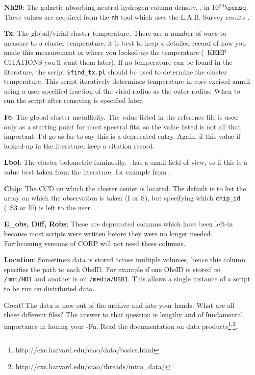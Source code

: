 {\bf{Nh20}}: The galactic absorbing neutral hydrogen column density,
\nhi, in $10^{20} \pcmsq$. These values are acquired from the
{\tt{nh}} tool which uses the L.A.B. Survey results \citep{lab}.

{\bf{Tx}}: The global/virial cluster temperature. There are a number
of ways to measure to a cluster temperature, it is best to keep a
detailed record of how you made this measurement or where you
looked-up the temperature (\eg\ KEEP CITATIONS you'll want them
later). If no temperature can be found in the literature, the script
{\tt{\$find\_tx.pl}} should be used to determine the cluster
temperature. This script iteratively determines temperature in
core-excised annuli using a user-specified fraction of the virial
radius as the outer radius. When to run the script after removing is
specified later.

{\bf{Fe}}: The global cluster metallicity. The value listed in the
reference file is used only as a starting point for most spectral
fits, so the value listed is not all that important. I'd go as far to
say this is a deprecated entry. Again, if this value if looked-up in
the literature, keep a citation record.

{\bf{Lbol}}: The cluster bolometric luminosity. \chandra\ has a small
field of view, so if this is a value best taken from the literature,
for example from \citet{hornerthesis}.

{\bf{Chip}}: The CCD on which the cluster center is located. The
default is to list the array on which the observation is taken (I or
S), but specifying which {\tt{chip\_id}} (\ie\ S3 or I0) is left to the
user.

{\bf{E\_obs, Diff, Robs}}: These are deprecated columns which have
been left-in because most scripts were written before they were no
longer needed. Forthcoming versions of CORP will not need these
columns.

{\bf{Location}}: Sometimes data is stored across multiple volumes,
hence this column specifies the path to each ObsID. For example if one
ObsID is stored on {\tt{/mnt/HD1}} and another is on
{\tt{/media/USB1}}. This allows a single instance of a script to be
run on distributed data.

Great! The data is now out of the archive and into your hands. What
are all these different files?  The answer to that question is lengthy
and of fundamental importance in honing your \ciao-Fu. Read the
documentation on data
products\footnote{http://cxc.harvard.edu/ciao/data/basics.html}$^{,}$\footnote{http://cxc.harvard.edu/ciao/threads/intro\_data/}.

